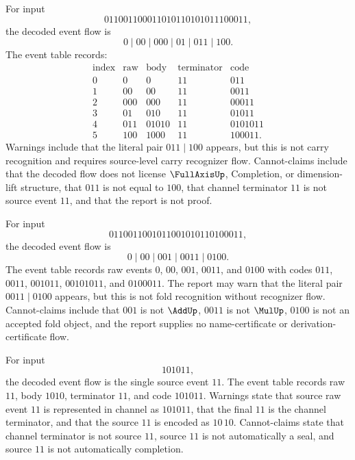 \begin{example}
\label{ex:source-report-completion-skeleton}
For input
$$
  011001100011010110101011100011,
$$
the decoded event flow is
$$
  0\mid 00\mid 000\mid 01\mid 011\mid 100.
$$
The event table records:
$$
\begin{array}{c|c|c|c|c}
\text{index} & \text{raw} & \text{body} & \text{terminator} & \text{code}\\
\hline
0 & 0   & 0     & 11 & 011\\
1 & 00  & 00    & 11 & 0011\\
2 & 000 & 000   & 11 & 00011\\
3 & 01  & 010   & 11 & 01011\\
4 & 011 & 01010 & 11 & 0101011\\
5 & 100 & 1000  & 11 & 100011.
\end{array}
$$
Warnings include that the literal pair $011\mid 100$ appears, but this is not carry recognition and requires source-level carry recognizer flow. Cannot-claims include that the decoded flow does not license $\FullAxisUp$, Completion, or dimension-lift structure, that $011$ is not equal to $100$, that channel terminator $11$ is not source event $11$, and that the report is not proof.
\end{example}

\begin{example}
\label{ex:source-report-add-fold-skeleton}
For input
$$
  0110011001011001010110100011,
$$
the decoded event flow is
$$
  0\mid 00\mid 001\mid 0011\mid 0100.
$$
The event table records raw events $0$, $00$, $001$, $0011$, and $0100$ with codes $011$, $0011$, $001011$, $00101011$, and $0100011$. The report may warn that the literal pair $0011\mid 0100$ appears, but this is not fold recognition without recognizer flow. Cannot-claims include that $001$ is not $\AddUp$, $0011$ is not $\MulUp$, $0100$ is not an accepted fold object, and the report supplies no name-certificate or derivation-certificate flow.
\end{example}

\begin{example}
\label{ex:source-report-raw-source-11}
For input
$$
  101011,
$$
the decoded event flow is the single source event $11$. The event table records raw $11$, body $1010$, terminator $11$, and code $101011$. Warnings state that source raw event $11$ is represented in channel as $101011$, that the final $11$ is the channel terminator, and that the source $11$ is encoded as $10\,10$. Cannot-claims state that channel terminator is not source $11$, source $11$ is not automatically a seal, and source $11$ is not automatically completion.
\end{example}

